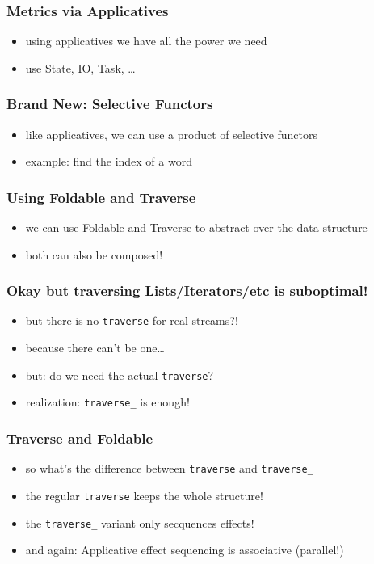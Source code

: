\documentclass{beamer}
\begin{document}
\begin{frame}
  \frametitle{Metrics via Applicatives}
  \begin{itemize}
  \item using applicatives we have all the power we need
  \item use State, IO, Task, \ldots
  \end{itemize}
\end{frame}

\begin{frame}
  \frametitle{Brand New: Selective Functors}
  \begin{itemize}
  \item like applicatives, we can use a product of selective functors
  \item example: find the index of a word
  \end{itemize}
\end{frame}

\begin{frame}
  \frametitle{Using Foldable and Traverse}
  \begin{itemize}
  \item we can use Foldable and Traverse to abstract over the data structure
  \item both can also be composed!
  \end{itemize}
\end{frame}

\begin{frame}
  \frametitle{Okay but traversing Lists/Iterators/etc is suboptimal!}
  \begin{itemize}
  \item but there is no \texttt{traverse} for real streams?!
  \item because there can't be one\ldots
  \item but: do we need the actual \texttt{traverse}?
  \item realization: \texttt{traverse\_} is enough!
  \end{itemize}
\end{frame}

\begin{frame}
  \frametitle{Traverse and Foldable}
  \begin{itemize}
  \item so what's the difference between \texttt{traverse} and \texttt{traverse\_}
  \item the regular \texttt{traverse} keeps the whole structure!
  \item the \texttt{traverse\_} variant only secquences effects!
  \item and again: Applicative effect sequencing is associative (parallel!)
  \end{itemize}
\end{frame}
\end{document}
